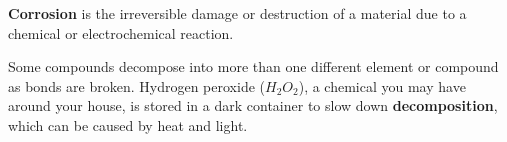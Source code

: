 \begin{definition}[Corrosion]
  \textbf{Corrosion} is the irreversible damage or destruction of a material
  due to a chemical or electrochemical reaction.
\end{definition}

\begin{definition}[Decomposition]
  Some compounds decompose into more than one different element or compound as
  bonds are broken. Hydrogen peroxide ($H_2O_2$), a chemical you may have
  around your house, is stored in a dark container to slow down
  \textbf{decomposition}, which can be caused by heat and light.
\end{definition}


\newpage
